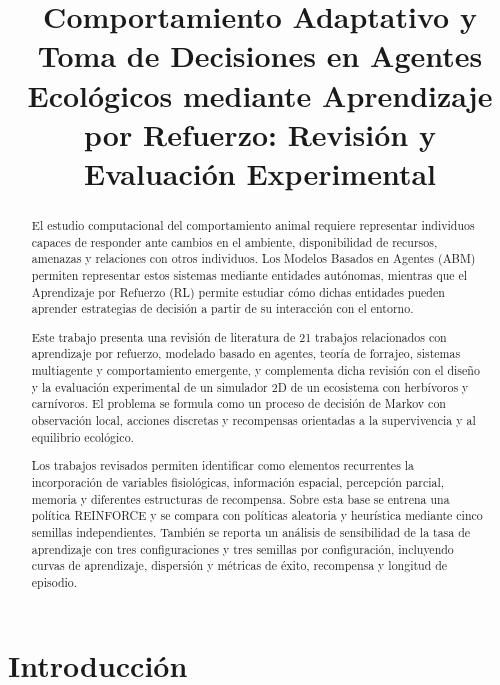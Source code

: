 \documentclass[conference]{IEEEtran}
\title{Comportamiento Adaptativo y Toma de Decisiones en Agentes Ecológicos mediante Aprendizaje por Refuerzo: Revisión y Evaluación Experimental}
\author{
\IEEEauthorblockN{Axel López Vega}
\and
\IEEEauthorblockN{Kevin Núñez Camacho}
\and
\IEEEauthorblockN{Felipe Murillo}
}
\begin{document}
\maketitle


\begin{abstract}

El estudio computacional del comportamiento animal requiere representar
individuos capaces de responder ante cambios en el ambiente, disponibilidad
de recursos, amenazas y relaciones con otros individuos. Los Modelos
Basados en Agentes (ABM) permiten representar estos sistemas mediante
entidades autónomas, mientras que el Aprendizaje por Refuerzo (RL) permite
estudiar cómo dichas entidades pueden aprender estrategias de decisión a
partir de su interacción con el entorno.

Este trabajo presenta una revisión de literatura de 21 trabajos
relacionados con aprendizaje por refuerzo, modelado basado en agentes,
teoría de forrajeo, sistemas multiagente y comportamiento emergente, y
complementa dicha revisión con el diseño y la evaluación experimental de un
simulador 2D de un ecosistema con herbívoros y carnívoros. El problema se
formula como un proceso de decisión de Markov con observación local, acciones
discretas y recompensas orientadas a la supervivencia y al equilibrio
ecológico.

Los trabajos revisados permiten identificar como elementos recurrentes la
incorporación de variables fisiológicas, información espacial, percepción
parcial, memoria y diferentes estructuras de recompensa. Sobre esta base se
entrena una política REINFORCE y se compara con políticas aleatoria y
heurística mediante cinco semillas independientes. También se reporta un
análisis de sensibilidad de la tasa de aprendizaje con tres configuraciones y
tres semillas por configuración, incluyendo curvas de aprendizaje, dispersión
y métricas de éxito, recompensa y longitud de episodio.

\end{abstract}


\section{Introducción}
\end{document}
